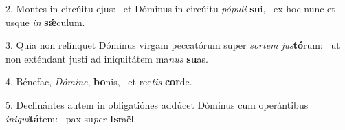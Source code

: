 2. Montes in circúitu ejus: \dag\  et Dóminus in circúitu \textit{pó}\textit{pu}\textit{li} \textbf{su}i, \ast\  ex hoc nunc et usque \textit{in} \textbf{sǽ}culum.\

3. Quia non relínquet Dóminus virgam peccatórum super \textit{sor}\textit{tem} \textit{jus}\textbf{tó}rum: \ast\  ut non exténdant justi ad iniquitátem ma\textit{nus} \textbf{su}as.\

4. Bénefac, \textit{Dó}\textit{mi}\textit{ne}, \textbf{bo}nis, \ast\  et rec\textit{tis} \textbf{cor}de.\

5. Declinántes autem in obligatiónes addúcet Dóminus cum operántibus \textit{in}\textit{i}\textit{qui}\textbf{tá}tem: \ast\  pax su\textit{per} \textbf{Is}raël.\


